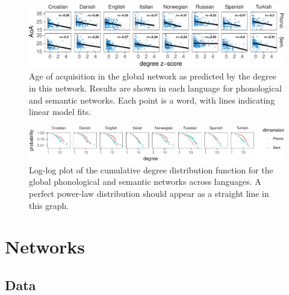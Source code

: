 \documentclass[10pt, letterpaper]{article}
\newenvironment{CodeChunk}{}{}
\begin{document}
\begin{CodeChunk}
\begin{figure}[h]

{\centering \includegraphics{figs/all_data-1} 

}

\caption{\label{fig:data_all}Age of acquisition in the global network as predicted by the degree in this network. Results are shown in each language for phonological and semantic networks. Each point is a word, with lines indicating linear model fits.}\label{fig:all_data}
\end{figure}
\end{CodeChunk}

\begin{CodeChunk}
\begin{figure}[h]

{\centering \includegraphics{figs/degree_distribution-1} 

}

\caption{\label{fig:degree_distribution}Log-log plot of the cumulative degree distribution function for the global phonological and semantic networks across languages. A perfect power-law distribution should appear as a straight line in this graph.}\label{fig:degree_distribution}
\end{figure}
\end{CodeChunk}

\section{Networks}\label{networks}

\subsection{Data}\label{data}
\end{document}
